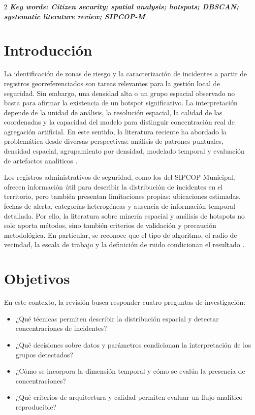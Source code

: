 \documentclass[10pt,twoside]{article}
\newcommand{\englishkeywords}[1]{\vspace{0.25em}\noindent\textbf{\textit{Key words: #1}}\par}
\begin{document}
\begin{multicols}{2}
\englishkeywords{Citizen security; spatial analysis; hotspots; DBSCAN; systematic literature review; SIPCOP-M}

\section{Introducción}

La identificación de zonas de riesgo y la caracterización de incidentes a partir de registros georreferenciados son tareas relevantes para la gestión local de seguridad. Sin embargo, una densidad alta o un grupo espacial observado no basta para afirmar la existencia de un hotspot significativo. La interpretación depende de la unidad de análisis, la resolución espacial, la calidad de las coordenadas y la capacidad del modelo para distinguir concentración real de agregación artificial. En este sentido, la literatura reciente ha abordado la problemática desde diversas perspectivas: análisis de patrones puntuales, densidad espacial, agrupamiento por densidad, modelado temporal y evaluación de artefactos analíticos \cite{medinaariza2023points,medinaariza2023time,medinaariza2023hotspots,cardone2022fuzzyhotspot,gustriansyah2022crime,changalasetty2023dbscan,leon2026dbscan}.

Los registros administrativos de seguridad, como los del SIPCOP Municipal, ofrecen información útil para describir la distribución de incidentes en el territorio, pero también presentan limitaciones propias: ubicaciones estimadas, fechas de alerta, categorías heterogéneas y ausencia de información temporal detallada. Por ello, la literatura sobre minería espacial y análisis de hotspots no solo aporta métodos, sino también criterios de validación y precaución metodológica. En particular, se reconoce que el tipo de algoritmo, el radio de vecindad, la escala de trabajo y la definición de ruido condicionan el resultado \cite{cutid2025,dubey2024crimehotspot}.

\section{Objetivos}

En este contexto, la revisión busca responder cuatro preguntas de investigación:

\begin{itemize}[leftmargin=*,itemsep=1pt]
\item ¿Qué técnicas permiten describir la distribución espacial y detectar concentraciones de incidentes?
\item ¿Qué decisiones sobre datos y parámetros condicionan la interpretación de los grupos detectados?
\item ¿Cómo se incorpora la dimensión temporal y cómo se evalúa la presencia de concentraciones?
\item ¿Qué criterios de arquitectura y calidad permiten evaluar un flujo analítico reproducible?
\end{itemize}


\end{multicols}
\end{document}

